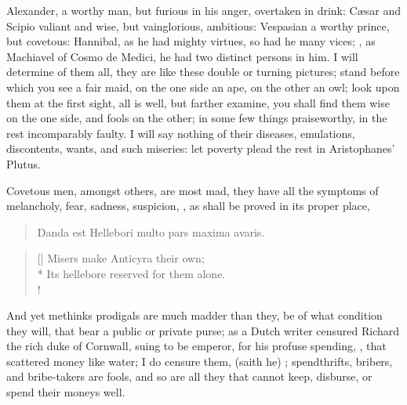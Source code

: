 {Alexander, a worthy man, but furious in his anger, overtaken in drink:
C\ae{}sar and Scipio valiant and wise, but vainglorious, ambitious:
Vespasian a worthy prince, but covetous: Hannibal, as he had
mighty virtues, so had he many vices; , as Machiavel of Cosmo de Medici, he had two distinct
persons in him. I will determine of them all, they are like these
double or turning pictures; stand before which you see a fair maid, on
the one side an ape, on the other an owl; look upon them at the first
sight, all is well, but farther examine, you shall find them wise on
the one side, and fools on the other; in some few things praiseworthy,
in the rest incomparably faulty. I will say nothing of their diseases,
emulations, discontents, wants, and such miseries: let poverty plead
the rest in Aristophanes' Plutus.

Covetous men, amongst others, are most mad, they have all the
symptoms of melancholy, fear, sadness, suspicion, \etc{}, as shall be
proved in its proper place,

\begin{verse}
\textlatin{Danda est Hellebori multo pars maxima avaris.}
\end{verse}

\settowidth{\versewidth}{Its hellebore reserved for them alone.}
\begin{verse}[\versewidth]
Misers make Anticyra their own;\\*
Its hellebore reserved for them alone.\\!
\end{verse}

And yet methinks prodigals are much madder than they, be of what
condition they will, that bear a public or private purse; as a
Dutch writer censured Richard the rich duke of Cornwall, suing to
be emperor, for his profuse spending, , that scattered money like water; I do
censure them,  (saith he) ; spendthrifts, bribers, and bribe-takers are fools, and so
are all they that cannot keep, disburse, or spend their moneys
well.

}
